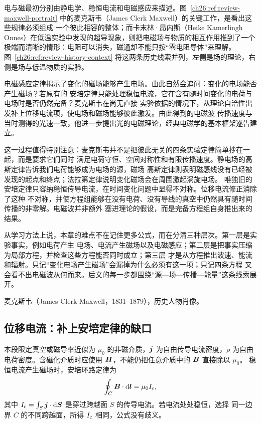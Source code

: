 {电与磁最初分别由静电学、稳恒电流和电磁感应来描述。图~\ref{ch26:ref:review-maxwell-portrait} 中的麦克斯韦（James Clerk Maxwell）的关键工作，是看出这些规律必须组成
一个彼此相容的整体；而卡末林·昂内斯（Heike Kamerlingh Onnes）在低温实验中发现的超导现象，则把电磁场与物质的相互作用推到了一个
极端而清晰的情形：电阻可以消失，磁通却不能只按“零电阻导体”来理解。图~\ref{ch26:ref:review-history-context} 将这两条历史线索并列，左侧是场的理论，右侧是场与低温物质的实验。

电磁感应定律揭示了变化的磁场能够产生电场。由此自然会追问：变化的电场能否产生磁场？若原有的
安培定律只能处理稳恒电流，它在含有随时间变化的电荷与电场时是否仍然完备？麦克斯韦在尚无直接
实验依据的情况下，从理论自洽性出发补上位移电流项，使电场和磁场能够彼此激发。由此得到的电磁波
传播速度与当时测得的光速一致，他进一步提出光的电磁理论，经典电磁学的基本框架遂告建立。

这一过程值得特别注意：麦克斯韦并不是把彼此无关的四条实验定律简单抄在一起，而是要求它们同时
满足电荷守恒、空间对称性和有限传播速度。静电场的高斯定律告诉我们电荷能够成为电场的源，磁场
高斯定律则表明磁感线没有已经被发现的起点和终点；法拉第定律说明变化磁场会在周围激起涡旋电场。
唯独旧的安培定律只容纳稳恒传导电流，在时间变化问题中显得不对称。位移电流修正消除了这种
不对称，并使方程组能够在没有电荷、没有导线的真空中仍然具有随时间传播的非零解。电磁波并非额外
塞进理论的假设，而是完备方程组自身推出来的结果。

从学习方法上说，本章的难点不在记住更多公式，而在分清三种层次。第一层是实验事实，例如电荷产生
电场、电流产生磁场以及电磁感应；第二层是把事实压缩为局部方程，并检查这些方程能否同时成立；第三层
才是从方程推出波速、能流和辐射。只记“变化电场产生磁场”会漏掉为什么必须有这一项；只记四条方程
又会看不出电磁波从何而来。后文的每一步都围绕“源—场—传播—能量”这条线索展开。

\maxwellOnnesContext

%
{麦克斯韦（James Clerk Maxwell，1831--1879），历史人物肖像。\label{ch26:ref:review-maxwell-portrait}}\label{ch26:fig:s41-10-1}


\subsection{位移电流：补上安培定律的缺口}


本段限定真空或磁导率近似为 $\mu_0$ 的非磁介质，$\bm{j}$ 为自由传导电流密度，$\rho$ 为自由电荷密度。含磁化介质时应使用 $\bm{H}$，不能仍把任意介质中的 $\bm{B}$ 直接除以 $\mu_0$。
稳恒电流产生磁场时，安培环路定律为
\begin{equation}
  \oint_C\bm{B}\cdot\mathop{}\!\mathrm d\bm{l}=\mu_0 I_{\rm c},
\end{equation}
其中 $I_{\rm c}=\int_S\bm{j}\cdot\mathop{}\!\mathrm d\bm{S}$ 是穿过跨越面 $S$ 的传导电流。若电流处处稳恒，选择
同一边界 $C$ 的不同跨越面，所得 $I_{\rm c}$ 相同，公式没有歧义。

}
